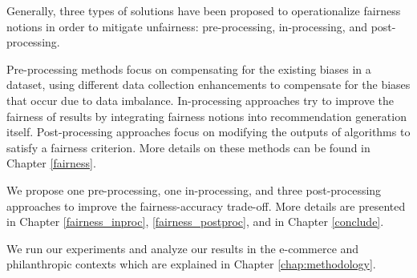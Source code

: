 Generally, three types of solutions have been proposed to operationalize fairness notions in order to mitigate  unfairness: pre-processing, in-processing, and post-processing.

Pre-processing methods focus on compensating for the existing biases in a dataset, using different data collection enhancements to compensate for the biases that occur due to data imbalance. In-processing approaches try to improve the fairness of results by integrating fairness notions into recommendation generation itself. Post-processing approaches focus on modifying the outputs of algorithms to satisfy a fairness criterion. More details on these methods can be found in Chapter \ref{fairness}.

We propose one pre-processing, one in-processing, and three post-processing approaches to improve the fairness-accuracy trade-off. More details are presented in Chapter \ref{fairness_inproc}, \ref{fairness_postproc}, and in Chapter \ref{conclude}.


We run our experiments and analyze our results in the e-commerce and philanthropic contexts which are explained in Chapter \ref{chap:methodology}.



